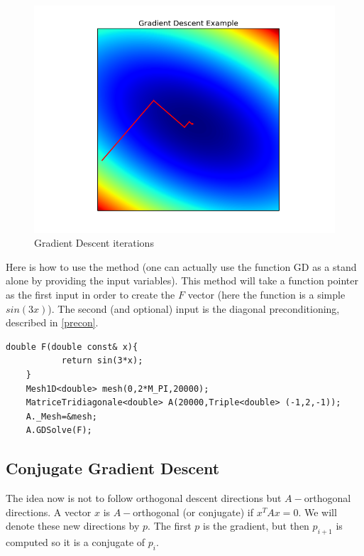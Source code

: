 \documentclass[a4paper]{report}
\begin{document}
\begin{figure}[H]
\begin{center}
\includegraphics[scale=0.40]{GD_example.png}\caption{Gradient Descent iterations}
\end{center}
\end{figure}

Here is how to use the method (one can actually use the function GD as a stand alone by providing the input variables).
This method will take a function pointer as the first input in order to create the $F$ vector (here the function is a simple $sin(3x)$). The second (and optional) input is the diagonal preconditioning, described in \ref{precon}.
\begin{lstlisting}[basicstyle=\tiny]
    double F(double const& x){
           return sin(3*x);
    }
    Mesh1D<double> mesh(0,2*M_PI,20000);
    MatriceTridiagonale<double> A(20000,Triple<double> (-1,2,-1));
    A._Mesh=&mesh;
    A.GDSolve(F);
\end{lstlisting}
\subsection{Conjugate Gradient Descent}
The idea now is not to follow orthogonal descent directions but $A-$orthogonal directions. A vector $x$ is $A-$orthogonal (or conjugate) if $x^T A x=0$. We will denote these new directions by $p$. The first $p$ is the gradient, but then $p_{i+1}$ is computed so it is a conjugate of $p_i$.
\\
\end{document}
